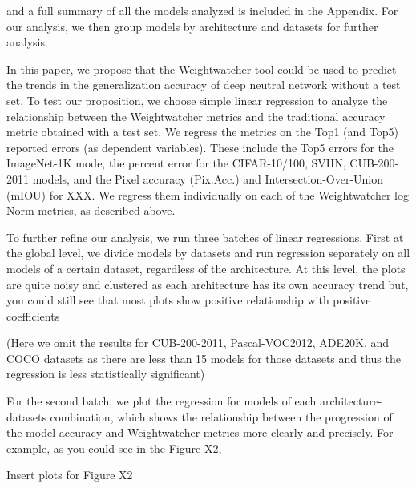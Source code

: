 


and a full summary of all the models analyzed is included in the Appendix. For our analysis, we then group models by architecture and datasets for further analysis.

In this paper, we propose that the Weightwatcher tool could be used to predict the trends in the generalization accuracy of deep neutral network without a test set. To test our proposition, we choose simple linear regression to analyze the relationship between the Weightwatcher metrics and the traditional accuracy metric obtained with a test set.
We regress the metrics on the Top1 (and Top5) reported errors (as dependent variables).  These include the Top5 errors for the ImageNet-1K mode, the percent error for the CIFAR-10/100, SVHN, CUB-200-2011 models, and the Pixel accuracy (Pix.Acc.) and Intersection-Over-Union (mIOU) for XXX.
We regress them individually on each of the Weightwatcher log Norm metrics, as described above.

To further refine our analysis, we run three batches of linear regressions. First at the global level, we divide models by datasets and run regression separately on all models of a certain dataset, regardless of the architecture. At this level, the plots are quite noisy and clustered as each architecture has its own accuracy trend but, you could still see that most plots show positive relationship with positive coefficients


(Here we omit the results for CUB-200-2011, Pascal-VOC2012, ADE20K, and COCO datasets as there are less than 15 models for those datasets and thus the regression is less statistically significant)


For the second batch, we plot the regression for models of each architecture-datasets combination, which shows the relationship between the progression of the model accuracy and Weightwatcher metrics more clearly and precisely. For example, as you could see in the Figure X2, 


Insert plots for Figure X2

